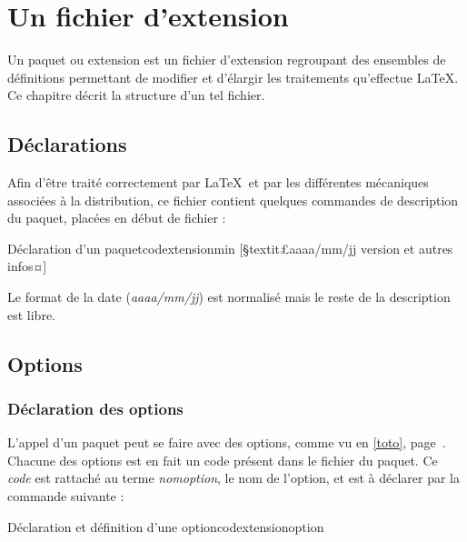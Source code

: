 
\chapter{Un fichier d'extension}

Un paquet ou extension est un fichier d'extension  regroupant des ensembles de définitions permettant de modifier et d'élargir les traitements qu'effectue \LaTeX. Ce chapitre décrit la structure d'un tel fichier.

\section{Déclarations}

Afin d'être traité correctement par \LaTeX\ et par les différentes mécaniques associées à la distribution, ce fichier contient quelques commandes de description du paquet, placées en début de fichier :

\begin{codesimple}{Déclaration d'un paquet}{codextensionmin}
[§textit£aaaa/mm/jj version et autres infos¤]
\end{codesimple}

Le format de la date (\emph{aaaa/mm/jj}) est normalisé mais le reste de la description est libre.

\section{Options}

\subsection{Déclaration des options}

L'appel d'un paquet peut se faire avec des options, comme vu en \ref{toto}, page~\pageref{toto}. Chacune des options est en fait un code présent dans le fichier du paquet. Ce \emph{code} est rattaché au terme \emph{nomoption}, le nom de l'option, et est à déclarer par la commande suivante :

\begin{codesimple}{Déclaration et définition d'une option}{codextensionoption}
\end{codesimple}


